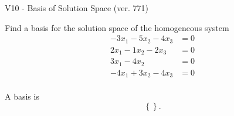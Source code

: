 \begin{exercise}
  \begin{exerciseTitle}V10 - Basis of Solution Space (ver. 771)\end{exerciseTitle}
  \begin{exerciseStatement}
    Find a basis for the solution space of the homogeneous system 
\begin{align*}
 -3 x_ 1 -5 x_ 2 -4 x_ 3 &= 0  \\ 
  2 x_ 1 -1 x_ 2 -2 x_ 3 &= 0  \\ 
  3 x_ 1 -4 x_ 2 &= 0  \\ 
  -4 x_ 1 + 3 x_ 2 -4 x_ 3 &= 0  \\ 
 \end{align*}


 
  \end{exerciseStatement}

  \begin{exerciseAnswer}
   A basis is   
\[\left\{\right\}.\]

  


  \end{exerciseAnswer}
\end{exercise}